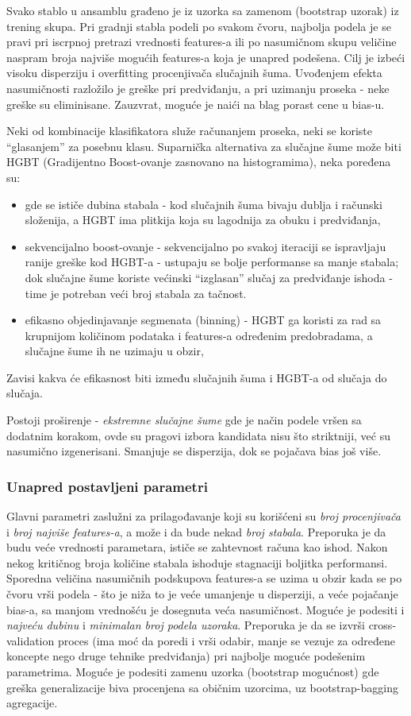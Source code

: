 \documentclass[fontsize=12bp, paper=a4]{scrarticle}
\begin{document}
Svako stablo u ansamblu građeno je iz uzorka sa zamenom (bootstrap uzorak) iz trening skupa.
Pri gradnji stabla podeli po svakom čvoru, najbolja podela je se pravi pri iscrpnoj pretrazi vrednosti features-a ili po nasumičnom skupu veličine naspram broja najviše mogućih features-a koja je unapred podešena. Cilj je izbeći visoku disperziju i overfitting procenjivača slučajnih šuma. Uvođenjem efekta nasumičnosti razložilo je greške pri predviđanju, a pri uzimanju proseka - neke greške su eliminisane. Zauzvrat, moguće je naići na blag porast cene u bias-u. 

Neki od kombinacije klasifikatora služe računanjem proseka, neki se koriste ``glasanjem'' za posebnu klasu.
Suparnička alternativa za slučajne šume može biti HGBT (Gradijentno Boost-ovanje zasnovano na histogramima), neka poređena su:
\begin{itemize}
    \item gde se ističe dubina stabala - kod slučajnih šuma bivaju dublja i računski složenija, a HGBT ima plitkija koja su lagodnija za obuku i predviđanja,
    \item sekvencijalno boost-ovanje - sekvencijalno po svakoj iteraciji se ispravljaju ranije greške kod HGBT-a - ustupaju se bolje performanse sa manje stabala; dok slučajne šume koriste većinski ``izglasan'' slučaj za predviđanje ishoda - time je potreban veći broj stabala za tačnost. 
    \item efikasno objedinjavanje segmenata (binning) - HGBT ga koristi za rad sa krupnijom količinom podataka i features-a određenim predobradama, a slučajne šume ih ne uzimaju u obzir,
\end{itemize}
Zavisi kakva će efikasnost biti između slučajnih šuma i HGBT-a od slučaja do slučaja.

Postoji proširenje - \textit{ekstremne slučajne šume} gde je način podele vršen sa dodatnim korakom, ovde su pragovi izbora kandidata nisu što striktniji, već su nasumično izgenerisani. Smanjuje se disperzija, dok se pojačava bias još više.

\subsubsection{Unapred postavljeni parametri}
Glavni parametri zaslužni za prilagođavanje koji su korišćeni su \textit{broj procenjivača} i \textit{broj najviše features-a}, a može i da bude nekad \textit{broj stabala}. Preporuka je da budu veće vrednosti parametara, ističe se zahtevnost računa kao ishod. Nakon nekog kritičnog broja količine stabala ishoduje stagnaciji boljitka performansi. Sporedna veličina nasumičnih podskupova features-a se uzima u obzir kada se po čvoru vrši podela - što je niža to je veće umanjenje u disperziji, a veće pojačanje bias-a, sa manjom vrednošću je dosegnuta veća nasumičnost. Moguće je podesiti i \textit{najveću dubinu} i \textit{minimalan broj podela uzoraka}. Preporuka je da se izvrši cross-validation proces (ima moć da poredi i vrši odabir, manje se vezuje za određene koncepte nego druge tehnike predviđanja\cite{cv}) pri najbolje moguće podešenim parametrima. Moguće je podesiti zamenu uzorka (bootstrap mogućnost) gde greška generalizacije biva procenjena sa običnim uzorcima, uz bootstrap-bagging agregacije. 
\end{document}
